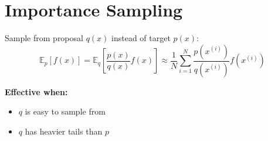 
\section{Importance Sampling}
\label{sec:importance-sampling}

Sample from proposal $q(x)$ instead of target $p(x)$:
\begin{equation}
\mathbb{E}_{p}[f(x)] = \mathbb{E}_{q}\left[\frac{p(x)}{q(x)} f(x)\right] \approx \frac{1}{N} \sum_{i=1}^{N} \frac{p(x^{(i)})}{q(x^{(i)})} f(x^{(i)})
\end{equation}

\textbf{Effective when:}
\begin{itemize}
    \item $q$ is easy to sample from
    \item $q$ has heavier tails than $p$
\end{itemize}

